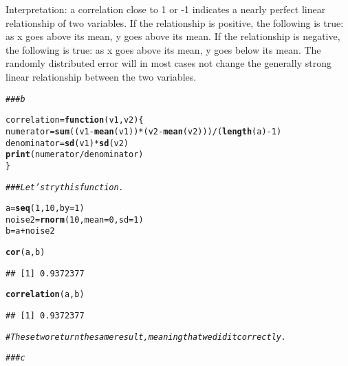 \documentclass[12pt,letter]{article}\usepackage[]{graphicx}\usepackage[]{color}
\makeatletter
\newcommand{\hlnum}[1]{\textcolor[rgb]{0.686,0.059,0.569}{#1}}%
\newcommand{\hlcom}[1]{\textcolor[rgb]{0.678,0.584,0.686}{\textit{#1}}}%
\newcommand{\hlopt}[1]{\textcolor[rgb]{0,0,0}{#1}}%
\newcommand{\hlstd}[1]{\textcolor[rgb]{0.345,0.345,0.345}{#1}}%
\newcommand{\hlkwa}[1]{\textcolor[rgb]{0.161,0.373,0.58}{\textbf{#1}}}%
\newcommand{\hlkwb}[1]{\textcolor[rgb]{0.69,0.353,0.396}{#1}}%
\newcommand{\hlkwc}[1]{\textcolor[rgb]{0.333,0.667,0.333}{#1}}%
\newcommand{\hlkwd}[1]{\textcolor[rgb]{0.737,0.353,0.396}{\textbf{#1}}}%
\newenvironment{kframe}{%
 \def\at@end@of@kframe{}%
 \ifinner\ifhmode%
  \def\at@end@of@kframe{\end{minipage}}%
  \begin{minipage}{\columnwidth}%
 \fi\fi%
 \def\FrameCommand##1{\hskip\@totalleftmargin \hskip-\fboxsep
 \colorbox{shadecolor}{##1}\hskip-\fboxsep
     \hskip-\linewidth \hskip-\@totalleftmargin \hskip\columnwidth}%
 \MakeFramed {\advance\hsize-\width
   \@totalleftmargin\z@ \linewidth\hsize
   \@setminipage}}%
 {\par\unskip\endMakeFramed%
 \at@end@of@kframe}
\newenvironment{knitrout}{}{} %
\makeatother
\begin{document}
Interpretation: a correlation close to 1 or -1 indicates a nearly perfect linear relationship of two variables. If the relationship is positive, the following is true: as x goes above its mean, y goes above its mean. If the relationship is negative, the following is true: as x goes above its mean, y goes below its mean. The randomly distributed error will in most cases not change the generally strong linear relationship between the two variables.

\begin{knitrout}
\color{fgcolor}\begin{kframe}
\begin{alltt}
\hlcom{### b}

\hlstd{correlation} \hlkwb{=} \hlkwa{function}\hlstd{(}\hlkwc{v1}\hlstd{,} \hlkwc{v2}\hlstd{) \{}
    \hlstd{numerator} \hlkwb{=} \hlkwd{sum}\hlstd{((v1} \hlopt{-} \hlkwd{mean}\hlstd{(v1))} \hlopt{*} \hlstd{(v2} \hlopt{-} \hlkwd{mean}\hlstd{(v2)))}\hlopt{/}\hlstd{(}\hlkwd{length}\hlstd{(a)} \hlopt{-} \hlnum{1}\hlstd{)}
    \hlstd{denominator} \hlkwb{=} \hlkwd{sd}\hlstd{(v1)} \hlopt{*} \hlkwd{sd}\hlstd{(v2)}
    \hlkwd{print}\hlstd{(numerator}\hlopt{/}\hlstd{denominator)}
\hlstd{\}}

\hlcom{### Let's try this function.}

\hlstd{a} \hlkwb{=} \hlkwd{seq}\hlstd{(}\hlnum{1}\hlstd{,} \hlnum{10}\hlstd{,} \hlkwc{by} \hlstd{=} \hlnum{1}\hlstd{)}
\hlstd{noise2} \hlkwb{=} \hlkwd{rnorm}\hlstd{(}\hlnum{10}\hlstd{,} \hlkwc{mean} \hlstd{=} \hlnum{0}\hlstd{,} \hlkwc{sd} \hlstd{=} \hlnum{1}\hlstd{)}
\hlstd{b} \hlkwb{=} \hlstd{a} \hlopt{+} \hlstd{noise2}

\hlkwd{cor}\hlstd{(a, b)}
\end{alltt}
\begin{verbatim}
## [1] 0.9372377
\end{verbatim}
\begin{alltt}
\hlkwd{correlation}\hlstd{(a, b)}
\end{alltt}
\begin{verbatim}
## [1] 0.9372377
\end{verbatim}
\begin{alltt}
\hlcom{# These two return the same result, meaning that we did it correctly.}

\hlcom{### c}


\end{alltt}
\end{kframe}
\end{knitrout}
\end{document}
